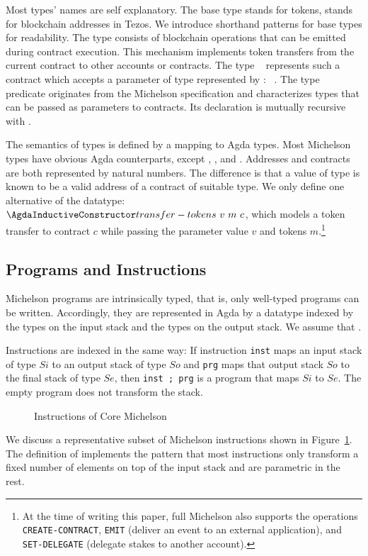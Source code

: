 Most types' names are self explanatory. The base type {\ABmutez} stands
for tokens, {\Aaddr} stands for blockchain addresses in  Tezos. We introduce
shorthand patterns for base types for readability.
The type {\Aoperation} consists of blockchain operations that can
be emitted during contract execution. This mechanism implements token
transfers from the current contract to other accounts or contracts.
The type {\Acontract~\AP} represents such a contract
which accepts a parameter of type {\Aty} represented by {\AP : \APassable~\Aty}.
The type predicate {\TypesPassable} originates from the Michelson
specification and characterizes types that can be passed as parameters
to contracts. Its declaration is mutually recursive with {\AType}.

The semantics of types is defined by a mapping to Agda types. Most
Michelson types have  obvious Agda counterparts, except {\Aaddr},
{\Acontract}, and {\Aoperation}.  Addresses and contracts are both
represented by natural numbers. The difference is that a value of type
{\Acontract} is known to be a valid address of a contract of suitable
type. We only define one alternative of the 
{\AOperation} datatype: {$\AtransferTokens~v~m~c$}, which models a
token transfer to contract $c$ while passing the parameter value $v$
and tokens $m$.\footnote{At the time of writing this paper, full Michelson also
  supports the operations \texttt{CREATE-CONTRACT}, \texttt{EMIT}
  (deliver an event to an external application), and
  \texttt{SET-DELEGATE} (delegate stakes to another account).}

\subsection{Programs and Instructions}
\label{sec:michelson-programs}


Michelson programs are intrinsically typed, that is, only well-typed
programs can be written. Accordingly, they are represented in
Agda by a datatype {\AProgram} indexed by the types on the input stack
and the types on the output stack. We assume that \TypesStack.
\SyntaxProgram

Instructions are indexed in the same way:
If  instruction \verb/inst/ maps an input stack of type $Si$ to an
output stack of type $So$
and \verb/prg/ maps that output stack $So$ to the final stack of type $Se$,
then \verb/inst ; prg/ is a program that maps $Si$ to $Se$.
The empty program {\Aend} does not transform the stack.

\begin{figure}[t]
  \SyntaxInstruction  
  \caption{Instructions of Core Michelson}
  \label{fig:core-michelson-instructions}
\end{figure}
We discuss a representative subset of Michelson instructions shown in Figure~\ref{fig:core-michelson-instructions}.
The definition of {\AInstructionPlus} implements the pattern that most
instructions only transform a fixed number of elements on top of the input stack and are parametric in the rest. 

